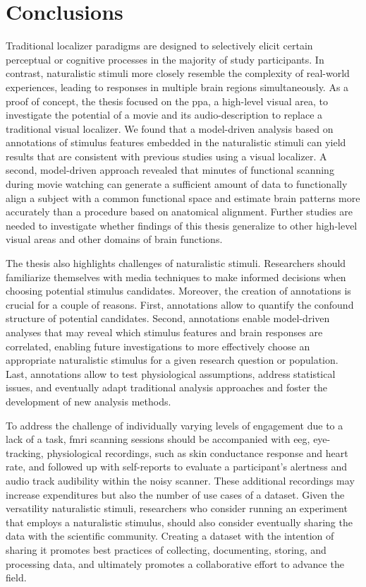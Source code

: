 \section{Conclusions}

%
Traditional localizer paradigms are designed to selectively elicit certain
perceptual or cognitive processes in the majority of study participants.
%
In contrast, naturalistic stimuli more closely resemble the complexity of
real-world experiences, leading to responses in multiple brain regions
simultaneously.
As a proof of concept, the thesis focused on the \ac{ppa}, a high-level visual
area, to investigate the potential of a movie and its audio-description to
replace a traditional visual localizer.
%
We found that a model-driven analysis based on annotations of stimulus features
embedded in the naturalistic stimuli can yield results that are consistent with
previous studies using a visual localizer.
%
A second, model-driven approach revealed that \unit[15]{minutes} of functional
scanning during movie watching can generate a sufficient amount of data to
functionally align a subject with a common functional space and estimate brain
patterns more accurately than a procedure based on anatomical alignment.
Further studies are needed to investigate whether findings of this thesis
generalize to other high-level visual areas and other domains of brain
functions.

The thesis also highlights challenges of naturalistic stimuli.
%
Researchers should familiarize themselves with media techniques to make informed
decisions when choosing potential stimulus candidates.
Moreover, the creation of annotations is crucial for a couple of reasons.
%
First, annotations allow to quantify the confound structure of potential
candidates.
%
Second, annotations enable model-driven analyses that may reveal which stimulus
features and brain responses are correlated, enabling future investigations to
more effectively choose an appropriate naturalistic stimulus for a given
research question or population.
%
Last, annotations allow to test physiological assumptions, address statistical
issues, and eventually adapt traditional analysis approaches and foster the
development of new analysis methods.

To address the challenge of individually varying levels of engagement due to a
lack of a task, \ac{fmri} scanning sessions should be accompanied with \ac{eeg},
eye-tracking, physiological recordings, such as skin conductance response and
heart rate, and followed up with self-reports to evaluate a participant's
alertness and audio track audibility within the noisy scanner.
%
These additional recordings may increase expenditures but also the number of use
cases of a dataset.
%
Given the versatility naturalistic stimuli, researchers who consider running an
experiment that employs a naturalistic stimulus, should also consider eventually
sharing the data with the scientific community.
Creating a dataset with the intention of sharing it promotes best practices of
collecting, documenting, storing, and processing data, and ultimately promotes a
collaborative effort to advance the field.


